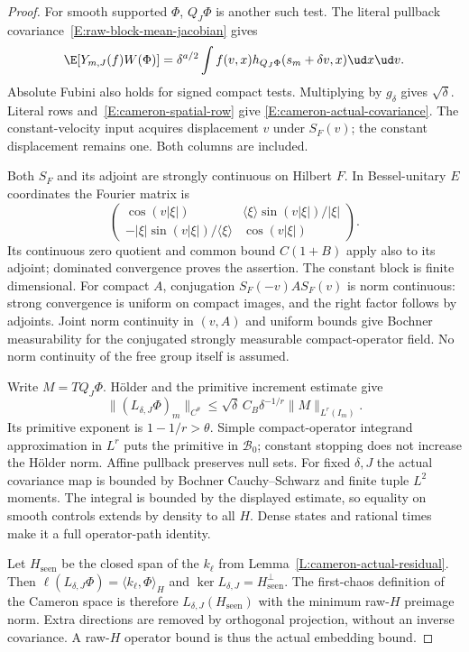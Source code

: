 \begin{proof}
  For smooth supported $\Phi$, $Q_J\Phi$ is another such test.
  The literal pullback covariance~\eqref{E:raw-block-mean-jacobian}
  gives
  \[
    \E[Y_{m,J}(f)W(\Phi)]
    =\delta^{a/2}\int f(v,x)
    h_{Q_J\Phi}(s_m+\delta v,x)\ud x\ud v .
  \]
  Absolute Fubini also holds for signed compact tests.
  Multiplying by $g_\delta$ gives $\sqrt\delta$.
  Literal rows and~\eqref{E:cameron-spatial-row} give
  \eqref{E:cameron-actual-covariance}. The constant-velocity
  input acquires displacement $v$ under $S_F(v)$; the constant
  displacement remains one. Both columns are included.

  Both $S_F$ and its adjoint are strongly continuous on Hilbert $F$.
  In Bessel-unitary $E$ coordinates the Fourier matrix is
  \[
    \begin{pmatrix}
      \cos(v|\xi|)&\langle\xi\rangle\sin(v|\xi|)/|\xi|\\
      -|\xi|\sin(v|\xi|)/\langle\xi\rangle&\cos(v|\xi|)
    \end{pmatrix}.
  \]
  Its continuous zero quotient and common bound $C(1+B)$ apply
  also to its adjoint; dominated convergence proves the assertion.
  The constant block is finite dimensional.
  For compact $A$, conjugation $S_F(-v)AS_F(v)$ is norm continuous:
  strong convergence is uniform on compact images, and the right
  factor follows by adjoints. Joint norm continuity in $(v,A)$
  and uniform bounds give Bochner measurability for the conjugated
  strongly measurable compact-operator field.
  No norm continuity of the free group itself is assumed.

  Write $M=TQ_J\Phi$. H\"older and the primitive increment estimate give
  \begin{equation}\label{E:cameron-local-primitive-bound}
    \|(L_{\delta,J}\Phi)_m\|_{C^\theta}
    \le\sqrt\delta\,C_B\delta^{-1/r}\|M\|_{L^r(I_m)}.
  \end{equation}
  Its primitive exponent is $1-1/r>\theta$.
  Simple compact-operator integrand approximation in $L^r$ puts
  the primitive in $\mathscr B_0$; constant stopping does not
  increase the H\"older norm.
  Affine pullback preserves null sets.
  For fixed $\delta,J$ the actual covariance map is bounded by
  Bochner Cauchy--Schwarz and finite tuple $L^2$ moments.
  The integral is bounded by the displayed estimate, so equality
  on smooth controls extends by density to all $H$.
  Dense states and rational times make it a full operator-path identity.

  Let $H_{\mathrm{seen}}$ be the closed span of the $k_\ell$
  from Lemma~\ref{L:cameron-actual-residual}.
  Then $\ell(L_{\delta,J}\Phi)=\langle k_\ell,\Phi\rangle_H$
  and $\ker L_{\delta,J}=H_{\mathrm{seen}}^\perp$.
  The first-chaos definition of the Cameron space is therefore
  $L_{\delta,J}(H_{\mathrm{seen}})$ with the minimum raw-$H$
  preimage norm. Extra directions are removed by orthogonal
  projection, without an inverse covariance.
  A raw-$H$ operator bound is thus the actual embedding bound.


\end{proof}
